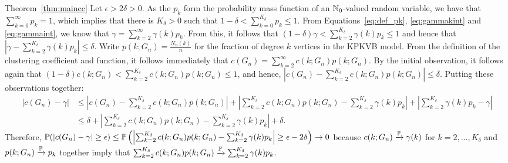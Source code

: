 \begin{proofof}{Theorem~\ref{thm:maincc}}
Let $\epsilon >2\delta >0$.
As the $p_k$ form the probability mass function of an $\mathbb{N}_0$-valued random variable, we have that $\sum_{k=0}^\infty p_k = 1$, which implies that there is $K_\delta >0$ such that $1-\delta < \sum_{k=0}^{K_\delta} p_k \leq 1$.
From Equations~\eqref{eq:def_pk}, \eqref{eq:gammakint} and \eqref{eq:gammaint}, we know that $\gamma = \sum_{k=2}^\infty \gamma(k)p_k$. 
From this, it follows that $(1-\delta)\gamma < \sum_{k=2}^{K_\delta} \gamma(k) p_k \leq 1$ and hence that $|\gamma - \sum_{k=2}^{K_\delta} \gamma(k)p_k| \leq \delta$. Write $p(k;G_n)=\frac{N_n(k)}{n}$ for the fraction of degree $k$ vertices in the KPKVB model. From the definition of the clustering coefficient and function, it follows immediately that $c(G_n) = \sum_{k=2}^\infty c(k;G_n)p(k;G_n)$. By the initial observation, it follows again that $(1-\delta)c(k;G_n) < \sum_{k=2}^{K_\delta} c(k;G_n)p(k;G_n) \leq 1$, and hence, $|c(G_n)-\sum_{k=2}^{K_\delta} c(k;G_n)p(k;G_n)| \leq \delta$.
Putting these observations together:
\begin{align*}
|c(G_n)-\gamma| &\leq \left|c(G_n)-\sum_{k=2}^{K_\delta}c(k;G_n)p(k;G_n)\right|+\left|\sum_{k=2}^{K_\delta} c(k;G_n)p(k;G_n) -\sum_{k=2}^{K_\delta} \gamma(k)p_k\right| +\left|\sum_{k=2}^{K_\delta} \gamma(k)p_k-\gamma\right| \\
 &\leq \delta +\left|\sum_{k=2}^{K_\delta} c(k;G_n)p(k;G_n) -\sum_{k=2}^{K_\delta} \gamma(k)p_k\right| +\delta. 
\end{align*}
Therefore, $\mathbb{P}(|c(G_n)-\gamma|\geq \epsilon) \leq \mathbb{P}\left(\left|\sum_{k=2}^{K_\delta} c(k;G_n)p(k;G_n) -\sum_{k=2}^{K_\delta} \gamma(k)p_k\right| \geq \epsilon - 2\delta\right) \rightarrow 0$ because $c(k;G_n) \xrightarrow{\mathbb{P}} \gamma(k)$ for $k=2,\dots,K_\delta$ and $p(k;G_n) \xrightarrow{\mathbb{P}} p_k$ together imply that $\sum_{k=2}^{K_\delta} c(k;G_n)p(k;G_n) \xrightarrow{\mathbb{P}} \sum_{k=2}^{K_\delta} \gamma(k) p_k$. %
\end{proofof}



